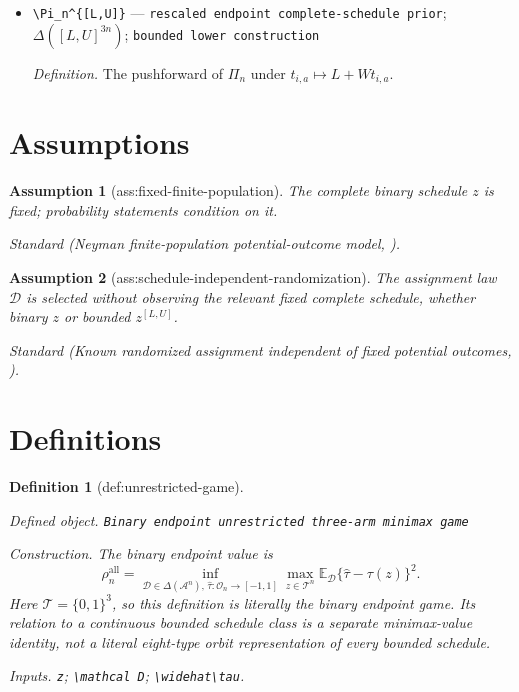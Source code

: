 \documentclass{article}
\newtheorem{assumption}{Assumption}
\newtheorem{definition}{Definition}
\begin{document}
\begin{itemize}
  \par\smallskip\noindent\emph{Definition.} The conditional expectation of \(W\delta_{n,q}\) after independent Bernoulliization of each normalized observed bounded outcome.
  \item \texttt{\textbackslash{}\allowbreak{}Pi\_\allowbreak{}n\textasciicircum{}\{[L,\allowbreak{}U]\}\allowbreak{}} --- \texttt{rescaled endpoint complete-\allowbreak{}schedule prior}; \(\Delta([L,U]^{3n})\); \texttt{bounded lower construction}
  \par\smallskip\noindent\emph{Definition.} The pushforward of \(\Pi_n\) under \(t_{i,a}\mapsto L+Wt_{i,a}\).
\end{itemize}

\section{Assumptions}

\begin{assumption}[ass:fixed-finite-population]\label{ass:fixed-finite-population}
The complete binary schedule \(z\) is fixed; probability statements condition on it.
\par\smallskip\noindent\emph{Standard} (Neyman finite-population potential-outcome model, \cite{MukerjeeDasguptaRubin2018}).
\end{assumption}

\begin{assumption}[ass:schedule-independent-randomization]\label{ass:schedule-independent-randomization}
The assignment law \(\mathcal D\) is selected without observing the relevant fixed complete schedule, whether binary \(z\) or bounded \(z^{[L,U]}\).
\par\smallskip\noindent\emph{Standard} (Known randomized assignment independent of fixed potential outcomes, \cite{MukerjeeDasguptaRubin2018}).
\end{assumption}

\section{Definitions}

\begin{definition}[def:unrestricted-game]\label{def:unrestricted-game}
\par\smallskip\noindent\emph{Defined object.} \texttt{Binary endpoint unrestricted three-\allowbreak{}arm minimax game}
\par\smallskip\noindent\emph{Construction.} The binary endpoint value is
\[
\rho_n^{\mathrm{all}}=\inf_{\mathcal D\in\Delta(\mathcal A^n),\,\widehat\tau:\mathcal O_n\to[-1,1]}
\max_{z\in\mathcal T^n}\mathbb E_{\mathcal D}\{\widehat\tau-\tau(z)\}^2.
\]
Here \(\mathcal T=\{0,1\}^3\), so this definition is literally the binary endpoint game.  Its relation to a continuous bounded schedule class is a separate minimax-value identity, not a literal eight-type orbit representation of every bounded schedule.
\par\smallskip\noindent\emph{Inputs.} \texttt{z}; \texttt{\textbackslash{}\allowbreak{}mathcal D}; \texttt{\textbackslash{}\allowbreak{}widehat\textbackslash{}\allowbreak{}tau}.
\end{definition}
\end{document}
